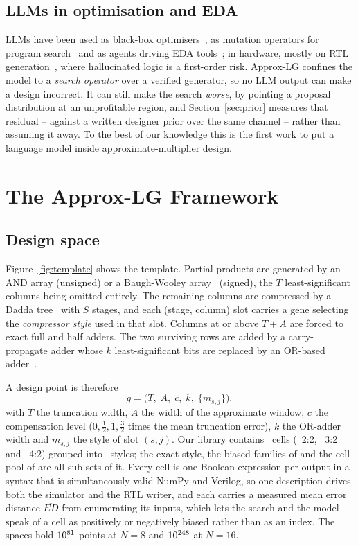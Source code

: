 \documentclass[acmsmall,review,anonymous]{acmart}
\begin{document}
\subsection{LLMs in optimisation and EDA}
LLMs have been used as black-box optimisers~\cite{opro}, as mutation operators
for program search~\cite{funsearch,eoh} and as agents driving EDA
tools~\cite{chateda}; in hardware, mostly on RTL
generation~\cite{chipchat,verigen,gpt4aigchip}, where hallucinated logic is a
first-order risk.  Approx-LG confines the model to a \emph{search operator}
over a verified generator, so no LLM output can make a design incorrect.  It
can still make the search \emph{worse}, by pointing a proposal distribution at
an unprofitable region, and Section~\ref{sec:prior} measures that residual --
against a written designer prior over the same channel -- rather than assuming
it away.  To the best of our knowledge this is the first
work to put a language model inside approximate-multiplier design.

\section{The Approx-LG Framework}
\subsection{Design space}
\label{sec:space}
Figure~\ref{fig:template} shows the template.  Partial products are generated by
an AND array (unsigned) or a Baugh-Wooley array~\cite{baugh1973} (signed), the
$T$ least-significant columns being omitted entirely.  The remaining columns
are compressed by a Dadda tree~\cite{dadda1965} with $S$ stages, and each
(stage, column) slot carries a gene selecting the \emph{compressor style} used
in that slot.  Columns at or above $T+A$ are forced to exact full and half
adders.  The two surviving rows are added by a carry-propagate adder whose
$k$ least-significant bits are replaced by an OR-based
adder~\cite{mahdiani2010}.

A design point is therefore
\begin{equation}
g=\bigl(T,\;A,\;c,\;k,\;\{m_{s,j}\}\bigr),
\end{equation}
with $T$ the truncation width, $A$ the width of the approximate window, $c$ the
compensation level ($0,\tfrac12,1,\tfrac32$ times the mean truncation error),
$k$ the OR-adder width and $m_{s,j}$ the style of slot $(s,j)$.  Our library
contains \Ncells\ cells (\NcellsHA\ 2:2, \NcellsFA\ 3:2 and \NcellsCFT\ 4:2)
grouped into \Nmodes\ styles; the exact style, the biased families of
\cite{wen2025} and the cell pool of \cite{devi2025} are all sub-sets of it.
Every cell is one Boolean expression per output in a syntax that is
simultaneously valid NumPy and Verilog, so one description drives both the
simulator and the RTL writer, and each carries a measured mean error distance
$\overline{ED}$ from enumerating its inputs, which lets the search and the
model speak of a cell as positively or negatively biased rather than as an
index.  The spaces hold $10^{81}$ points at $N=8$ and $10^{248}$ at
$N=16$.
\end{document}
